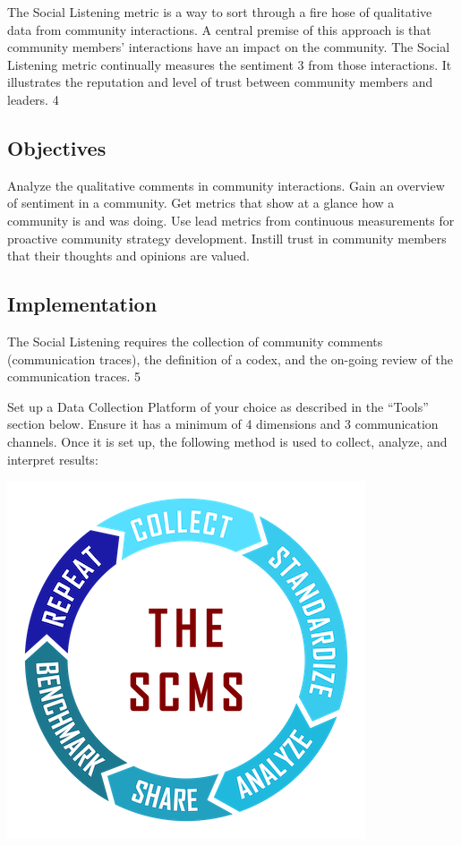 The Social Listening metric is a way to sort through a fire hose of
qualitative data from community interactions. A central premise of this
approach is that community members' interactions have an impact on the
community. The Social Listening metric continually measures the
sentiment 3 from those interactions. It illustrates the reputation and
level of trust between community members and leaders. 4

\hypertarget{objectives}{%
\subsection{Objectives}\label{objectives}}

Analyze the qualitative comments in community interactions. Gain an
overview of sentiment in a community. Get metrics that show at a glance
how a community is and was doing. Use lead metrics from continuous
measurements for proactive community strategy development. Instill trust
in community members that their thoughts and opinions are valued.

\hypertarget{implementation}{%
\subsection{Implementation}\label{implementation}}

The Social Listening requires the collection of community comments
(communication traces), the definition of a codex, and the on-going
review of the communication traces. 5

Set up a Data Collection Platform of your choice as described in the
``Tools'' section below. Ensure it has a minimum of 4 dimensions and 3
communication channels. Once it is set up, the following method is used
to collect, analyze, and interpret results:

\includegraphics{images/social-listening_circle2.png}

